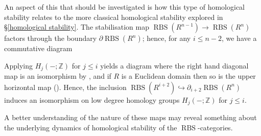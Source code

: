 \documentclass[12pt, reqno]{amsart}
\theoremstyle{plain}
\theoremstyle{definition}
\newcommand{\Z}{\mathbb Z}
\begin{document}
An aspect of this that should be investigated is how this type of homological stability relates to the more classical homological stability explored in \S \ref{homological stability}. The stabilisation map $\operatorname{RBS}(R^{n-1})\rightarrow \operatorname{RBS}(R^n)$ factors through the boundary $\partial \operatorname{RBS}(R^n)$; hence, for any $i\leq n-2$, we have a commutative diagram
\begin{center}
\end{center}

Applying $H_j(-; \Z)$ for $j\leq i$ yields a diagram where the right hand diagonal map is an isomorphism by \cite[Theorem 4.2.1]{Damia}, and if $R$ is a Euclidean domain then so is the upper horizontal map (). Hence, the inclusion $\operatorname{RBS}(R^{i+2})\hookrightarrow \partial_{i+2}\operatorname{RBS}(R^n)$ induces an isomorphism on low degree homology groups $H_j(-;\Z)$ for $j\leq i$.

A better understanding of the nature of these maps may reveal something about the underlying dynamics of homological stability of the $\operatorname{RBS}$-categories.





\medskip
\end{document}
